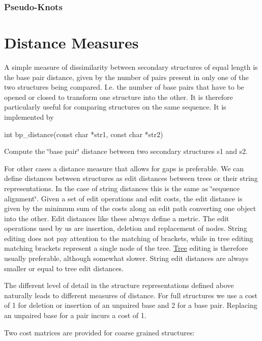 \hypertarget{secondary_structures_pseudo-knots}{}\subsubsection{Pseudo-\/\+Knots}\label{secondary_structures_pseudo-knots}
\hypertarget{distance_measures}{}\section{Distance Measures}\label{distance_measures}
A simple measure of dissimilarity between secondary structures of equal length is the base pair distance, given by the number of pairs present in only one of the two structures being compared. I.\+e. the number of base pairs that have to be opened or closed to transform one structure into the other. It is therefore particularly useful for comparing structures on the same sequence. It is implemented by

\begin{DoxyVerb}int bp_distance(const char *str1,
                const char *str2)
\end{DoxyVerb}
 Compute the \char`\"{}base pair\char`\"{} distance between two secondary structures s1 and s2.

For other cases a distance measure that allows for gaps is preferable. We can define distances between structures as edit distances between trees or their string representations. In the case of string distances this is the same as \char`\"{}sequence alignment\char`\"{}. Given a set of edit operations and edit costs, the edit distance is given by the minimum sum of the costs along an edit path converting one object into the other. Edit distances like these always define a metric. The edit operations used by us are insertion, deletion and replacement of nodes. String editing does not pay attention to the matching of brackets, while in tree editing matching brackets represent a single node of the tree. \mbox{\hyperlink{structTree}{Tree}} editing is therefore usually preferable, although somewhat slower. String edit distances are always smaller or equal to tree edit distances.

The different level of detail in the structure representations defined above naturally leads to different measures of distance. For full structures we use a cost of 1 for deletion or insertion of an unpaired base and 2 for a base pair. Replacing an unpaired base for a pair incurs a cost of 1.

Two cost matrices are provided for coarse grained structures\+:

